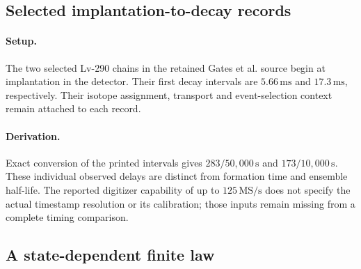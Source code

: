 \subsection{Selected implantation-to-decay records}
\label{manual2:lv-event-records}
\paragraph{Setup.}
The two selected Lv-290 chains in the retained Gates et al. source begin at
implantation in the detector. Their first decay intervals are
\(5.66\,\mathrm{ms}\) and \(17.3\,\mathrm{ms}\), respectively. Their isotope
assignment, transport and event-selection context remain attached to each record.

\paragraph{Derivation.}
Exact conversion of the printed intervals gives \(283/50{,}000\,\mathrm{s}\)
and \(173/10{,}000\,\mathrm{s}\). These individual observed delays are
distinct from formation time and ensemble half-life. The reported digitizer
capability of up to \(125\,\mathrm{MS/s}\) does not specify the actual timestamp
resolution or its calibration; those inputs remain missing from a complete
timing comparison.


\subsection{A state-dependent finite law}
\label{manual2:survival-law}

